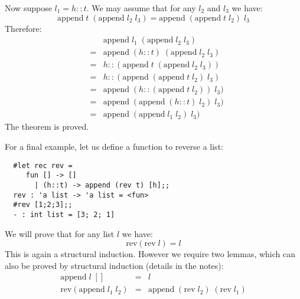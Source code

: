 \begin{slide*}


\vspace*{0.5cm}

Now suppose {\red $l_1 = h::t$}. We may assume that for any {\red $l_2$}
and {\red $l_3$} we have:
{\red $$ \mbox{append}\; t\; (\mbox{append}\; l_2\; l_3) = \mbox{append}\;
(\mbox{append}\; t\; l_2)\; l_3 $$}
\noindent Therefore:
{\red \begin{eqnarray*}
& & \mbox{append}\; l_1\; (\mbox{append}\; l_2\; l_3)           \\
& = & \mbox{append}\; (h::t)\; (\mbox{append}\; l_2\; l_3)      \\
& = & h::(\mbox{append}\; t\; (\mbox{append}\; l_2\; l_3))      \\
& = & h::(\mbox{append}\; (\mbox{append}\; t\; l_2)\; l_3)      \\
& = & \mbox{append}\; (h::(\mbox{append}\; t\; l_2))\; l_3)     \\
& = & \mbox{append}\; (\mbox{append}\; (h::t)\; l_2)\; l_3)     \\
& = & \mbox{append}\; (\mbox{append}\; l_1\; l_2)\; l_3)
\end{eqnarray*}}
The theorem is proved.

\end{slide*}







\begin{slide*}


\vspace*{0.2cm}

For a final example, let us define a function to reverse a list:
\begin{black}\begin{verbatim}
  #let rec rev =
     fun [] -> []
       | (h::t) -> append (rev t) [h];;
  rev : 'a list -> 'a list = <fun>
  #rev [1;2;3];;
  - : int list = [3; 2; 1]
\end{verbatim}\end{black}
We will prove that for any list {\red $l$} we have:
{\red $$ \mbox{rev} (\mbox{rev}\; l) = l $$}
This is again a structural induction. However we require two lemmas, which can
also be proved by structural induction (details in the notes):
{\red
\begin{eqnarray*}
\mbox{append}\; l\; [] & = & l          \\
\mbox{rev}(\mbox{append}\; l_1\; l_2) & = & \mbox{append}\; (\mbox{rev}\; l_2)\; (\mbox{rev}\; l_1)
\end{eqnarray*}}
\end{slide*}



